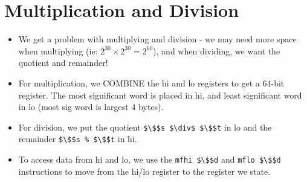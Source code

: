 \documentclass[12pt]{article}
\begin{document}
\section{Multiplication and Division}
\begin{itemize}
    \item We get a problem with multiplying and division - we may need more space when multiplying (ie: $2^{30} \times 2^{30} = 2^{60}$), and when dividing, we want the quotient and remainder!
    \item For multiplication, we COMBINE the hi and lo registers to get a 64-bit register.  The most significant word is placed in hi, and least significant word in lo (most sig word is largest 4 bytes).
    \item For division, we put the quotient \lstinline[mathescape]{$\$$s $\div$ $\$$t} in lo and the remainder \lstinline[mathescape]{$\$$s % $\$$t} in hi.
    \item To access data from hi and lo, we use the \lstinline[mathescape]{mfhi $\$$d} and \lstinline[mathescape]{mflo $\$$d} instructions to move from the hi/lo register to the register we state.
\end{itemize}
\end{document}

